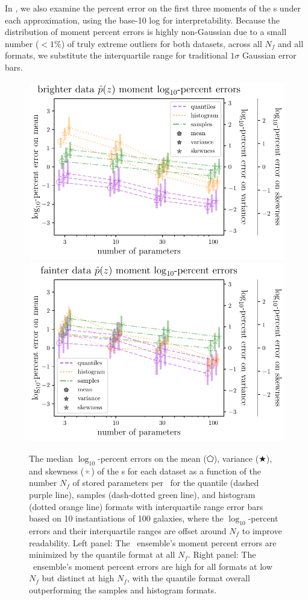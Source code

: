 In , we also examine the percent error on the 
first three moments of the \pz s under each approximation, using the base-10 
log for interpretability.
Because the distribution of moment percent errors is highly non-Gaussian due to 
a small number ($<1\%$) of truly extreme outliers for both datasets, across all 
$N_{f}$ and all formats, we substitute the interquartile range for traditional 
$1\sigma$ Gaussian error bars.
\begin{figure}
	\begin{center}
		\includegraphics[width=0.49\columnwidth]{figures/qp/graham_pz_err.pdf}
		\includegraphics[width=0.49\columnwidth]{figures/qp/schmidt_pz_err.pdf}
		\caption{
			The median $\log_{10}$-percent errors on the mean ($\pentagon$), variance 
			($\bigstar$), and skewness ($\APLstar$) of the \pz s for each dataset as a 
			function of the number $N_{f}$ of stored parameters per \pz\ for the quantile 
			(dashed purple line), samples (dash-dotted green line), and histogram (dotted 
			orange line) formats with interquartile range error bars based on 10 
			instantiations of 100 galaxies, where the $\log_{10}$-percent errors and their 
			interquartile ranges are offset around $N_{f}$ to improve readability.
			Left panel: The \mgdata \pz\ ensemble's moment percent errors are minimized 
			by the quantile format at all $N_{f}$.
			Right panel: The \ssdata \pz\ ensemble's moment percent errors are high for 
			all formats at low $N_{f}$ but distinct at high $N_{f}$, with the quantile 
			format overall outperforming the samples and histogram formats.
			}
	\end{center}
\end{figure}

